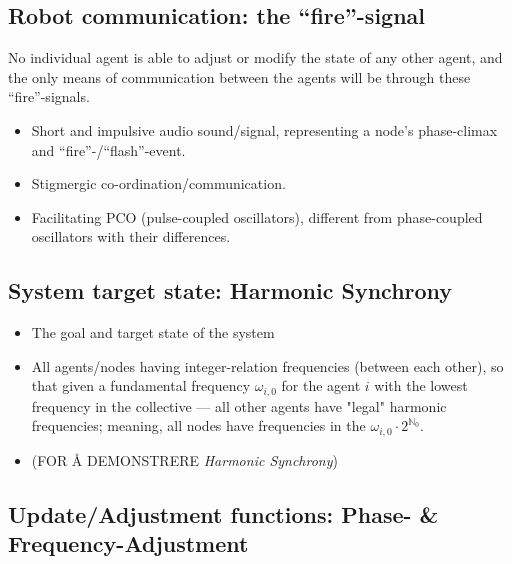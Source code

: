 	\subsection{Robot communication: the ``fire''-signal}
	\label{subsec:fire_signal}
	
	No individual agent is able to adjust or modify the state of any other agent, and the only means of communication between the agents will be through these ``fire''-signals.
	
		\begin{itemize}
			\item Short and impulsive audio sound/signal, representing a node's phase-climax and ``fire''-/``flash''-event.
			\item Stigmergic co-ordination/communication.
			\item Facilitating PCO (pulse-coupled oscillators), different from phase-coupled oscillators with their differences.
		\end{itemize}

	

	\subsection{System target state: Harmonic Synchrony}
	\label{subsec:harmonic_synchrony}
		\begin{itemize}
			\item The goal and target state of the system
			\item All agents/nodes having integer-relation frequencies (between each other), so that given a fundamental frequency $\omega_{i,0}$ for the agent $i$ with the lowest frequency in the collective — all other agents have "legal" harmonic frequencies; meaning, all nodes have frequencies in the  $\omega_{i,0} \cdot 2^{\mathbb{N}_0}$.
			\item (FOR Å DEMONSTRERE \textit{Harmonic Synchrony}) 
		\end{itemize}
	
	
	\subsection{Update/Adjustment functions: Phase- \& Frequency-Adjustment}
	\label{subsec:update_functions}
	
